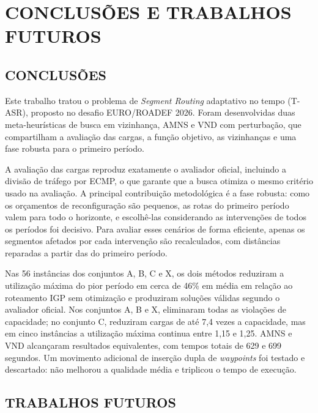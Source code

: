\chapter{CONCLUSÕES E TRABALHOS FUTUROS}
\label{cap:conclusao}

\section{\uppercase{Conclusões}}

Este trabalho tratou o problema de \textit{Segment Routing} adaptativo no tempo (T-ASR), proposto no desafio EURO/ROADEF 2026. Foram desenvolvidas duas meta-heurísticas de busca em vizinhança, AMNS e VND com perturbação, que compartilham a avaliação das cargas, a função objetivo, as vizinhanças e uma fase robusta para o primeiro período.

A avaliação das cargas reproduz exatamente o avaliador oficial, incluindo a divisão de tráfego por ECMP, o que garante que a busca otimiza o mesmo critério usado na avaliação. A principal contribuição metodológica é a fase robusta: como os orçamentos de reconfiguração são pequenos, as rotas do primeiro período valem para todo o horizonte, e escolhê-las considerando as intervenções de todos os períodos foi decisivo. Para avaliar esses cenários de forma eficiente, apenas os segmentos afetados por cada intervenção são recalculados, com distâncias reparadas a partir das do primeiro período.

Nas 56 instâncias dos conjuntos A, B, C e X, os dois métodos reduziram a utilização máxima do pior período em cerca de 46\% em média em relação ao roteamento IGP sem otimização e produziram soluções válidas segundo o avaliador oficial. Nos conjuntos A, B e X, eliminaram todas as violações de capacidade; no conjunto C, reduziram cargas de até 7,4 vezes a capacidade, mas em cinco instâncias a utilização máxima continua entre 1,15 e 1,25. AMNS e VND alcançaram resultados equivalentes, com tempos totais de 629 e 699 segundos. Um movimento adicional de inserção dupla de \textit{waypoints} foi testado e descartado: não melhorou a qualidade média e triplicou o tempo de execução.

\section{\uppercase{Trabalhos Futuros}}

